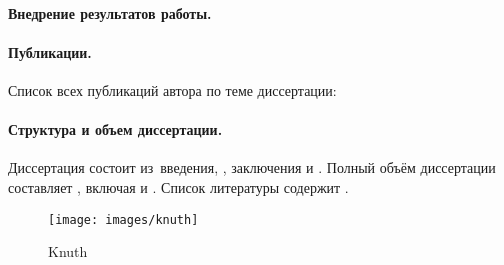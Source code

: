 \paragraph*{Внедрение результатов работы.}

\paragraph*{Публикации.} Список всех публикаций автора по теме диссертации:
\insertpapperScopus



\paragraph*{Структура и объем диссертации. }
Диссертация состоит из~введения,
,
заключения и
.
%
Полный объём диссертации составляет
, включая
 и
.
Список литературы содержит
.


\begin{figure}
    \centering
    \texttt{[image: images/knuth]}
    \caption{Knuth}
    \label{fig:my_label}
\end{figure}